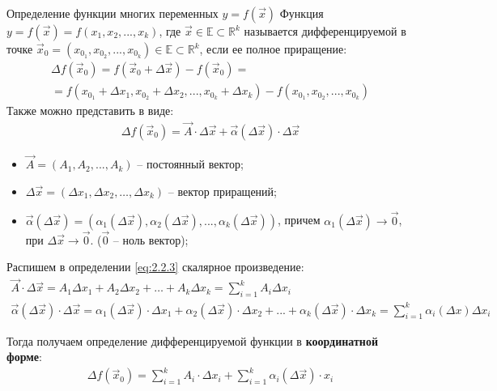 \begin{tbox}{Определение функции многих переменных $y = f(\vec{x})$}
	Функция $\boxed{y = f(\vec{x})} = f(x_1, x_2, ..., x_k)$, где $\vec{x} \in \mathbb{E} \subset \mathbb{R}^k$  называется дифференцируемой в точке $\boxed{\vec{x}_0} = (x_{\text{$0_1$}}, x_{\text{$0_2$}}, ..., x_{\text{$0_k$}}) \in \mathbb{E} \subset \mathbb{R}^k$, если ее полное приращение:
	\begin{multline*}
		\Delta f(\vec{x}_0) = f(\vec{x}_0 + \Delta \vec{x}) - f(\vec{x}_0) =\\= f(x_{\text{$0_1$}} + \Delta x_1, x_{\text{$0_2$}} + \Delta x_2, ..., x_{\text{$0_k$}} + \Delta x_k) - f(x_{\text{$0_1$}}, x_{\text{$0_2$}}, ..., x_{\text{$0_k$}})
	\end{multline*}
	Также можно представить в виде:
	\begin{align} \label{eq:2.2.3}
		\boxed{\Delta f(\vec{x}_0) = \vec{A} \cdot \Delta \vec{x} + \vec{\alpha}(\Delta \vec{x}) \cdot \Delta \vec{x}}
	\end{align}
	\begin{itemize}
		\item $\vec{A} = (A_1, A_2, ..., A_k)$ -- постоянный вектор;
		\item $\Delta \vec{x} = (\Delta x_1, \Delta x_2, \dots, \Delta x_k)$ -- вектор приращений;
		\item $\vec{\alpha}(\Delta \vec{x}) = (\alpha_1(\Delta \vec{x}), \alpha_2(\Delta \vec{x}), ..., \alpha_k(\Delta \vec{x}))$, причем $\alpha_1(\Delta \vec{x}) \to \vec{0}$, при $\Delta \vec{x} \to \vec{0}$. ($\vec{0}$ -- ноль вектор);
	\end{itemize}
\end{tbox}
Распишем в определении \ref{eq:2.2.3} скалярное произведение:
\begin{gather*}
	\vec{A} \cdot \Delta \vec{x} = A_1 \Delta x_1 + A_2 \Delta x_2 + \dots + A_k \Delta x_k = \sum_{i=1}^k A_i \Delta x_i \\
	\vec{\alpha}(\Delta \vec{x}) \cdot \Delta \vec{x} = \alpha_1 (\Delta \vec{x}) \cdot \Delta x_1 + \alpha_2 (\Delta \vec{x}) \cdot \Delta x_2 + ... + \alpha_k (\Delta \vec{x}) \cdot \Delta x_k = \sum_{i = 1}^{k} \alpha_i (\Delta x) \Delta x_i
\end{gather*}

Тогда получаем определение дифференцируемой функции в \textbf{координатной форме}:
\begin{align} \label{eq:2.2.4}
	\boxed{\Delta f(\vec{x}_0) = \sum_{i=1}^k A_i \cdot \Delta x_i + \sum_{i=1}^k \alpha_i (\Delta \vec{x}) \cdot x_i}
\end{align}


